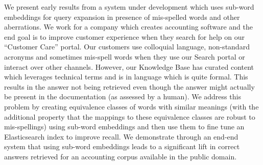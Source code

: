 We present early results from a system under development which uses sub-word embeddings  for query expansion in presence of mis-spelled words and other aberrations. We work for a company which creates accounting software and the end goal is to improve customer experience when they search for help on our ``Customer Care'' portal. Our customers use colloquial language, non-standard acronyms and sometimes mis-spell words when they use our Search portal or interact over other channels. However, our Knowledge Base has curated content which leverages technical terms and is in language which is quite formal. This results in the answer not being  retrieved even though the answer might actually be present in the documentation (as assessed by a human). We address this problem by creating equivalence classes of words with similar meanings (with the additional property that the mappings to these equivalence classes are robust to mis-spellings) using sub-word embeddings and then use them to fine tune an Elasticsearch index  to improve recall.  We demonstrate through an end-end system that using sub-word embeddings leads to a significant lift in correct answers retrieved for an accounting corpus available in the public domain.
